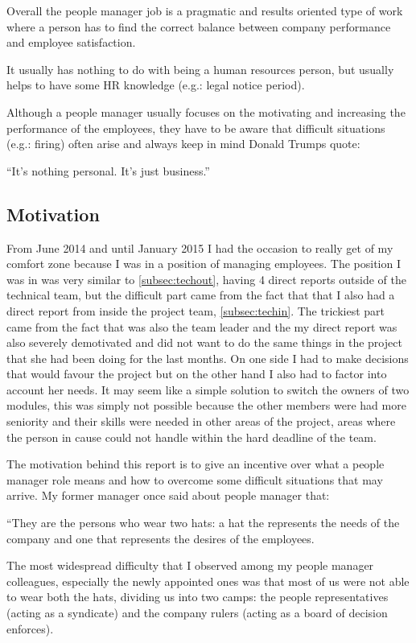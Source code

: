 Overall the people manager job is a pragmatic and results oriented type of work where a person has to find the correct balance between company performance and employee satisfaction.

It usually has nothing to do with being a human resources person, but usually helps to have some HR knowledge (e.g.: legal notice period). 

Although a people manager usually focuses on the motivating and increasing the performance of the employees, they have to be aware that difficult situations (e.g.: firing) often arise and always keep in mind Donald Trumps quote:

\begin{displayquote}
``It's nothing personal. It's just business.''
\end{displayquote}

\subsection{Motivation}
\label{sub-sec:Motivation}

From June 2014 and until January 2015 I had the occasion to really get of my comfort zone because I was in a position of managing employees. The position I was in was very similar to \ref{subsec:techout}, having 4 direct reports outside of the technical team, but the difficult part came from the fact that that I also had a direct report from inside the project team, \ref{subsec:techin}. The trickiest part came from the fact that was also the team leader and the my direct report was also severely demotivated and did not want to do the same things in the project that she had been doing for the last months. On one side I had to make decisions that would favour the project but on the other hand I also had to factor into account her needs. It may seem like a simple solution to switch the owners of two modules, this was simply not possible because the other members were had more seniority and their skills were needed in other areas of the project, areas where the person in cause could not handle within the hard deadline of the team.

The motivation behind this report is to give an incentive over what a people manager role means and how to overcome some difficult situations that may arrive. My former manager once said about people manager that:
\begin{displayquote}
``They are the persons who wear two hats: a hat the represents the needs of the company and one that represents the desires of the employees.
\end{displayquote}
The most widespread difficulty that I observed among my people manager colleagues, especially the newly appointed ones was that most of us were not able to wear both the hats, dividing us into two camps: the people representatives (acting as a syndicate) and the company rulers (acting as a board of decision enforces).

